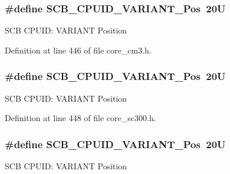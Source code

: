 \subsubsection[{\texorpdfstring{S\+C\+B\+\_\+\+C\+P\+U\+I\+D\+\_\+\+V\+A\+R\+I\+A\+N\+T\+\_\+\+Pos}{SCB_CPUID_VARIANT_Pos}}]{\setlength{\rightskip}{0pt plus 5cm}\#define S\+C\+B\+\_\+\+C\+P\+U\+I\+D\+\_\+\+V\+A\+R\+I\+A\+N\+T\+\_\+\+Pos~20U}\hypertarget{group___c_m_s_i_s___s_c_b_ga104462bd0815391b4044a70bd15d3a71}{}\label{group___c_m_s_i_s___s_c_b_ga104462bd0815391b4044a70bd15d3a71}
S\+CB C\+P\+U\+ID\+: V\+A\+R\+I\+A\+NT Position 

Definition at line 446 of file core\+\_\+cm3.\+h.

\subsubsection[{\texorpdfstring{S\+C\+B\+\_\+\+C\+P\+U\+I\+D\+\_\+\+V\+A\+R\+I\+A\+N\+T\+\_\+\+Pos}{SCB_CPUID_VARIANT_Pos}}]{\setlength{\rightskip}{0pt plus 5cm}\#define S\+C\+B\+\_\+\+C\+P\+U\+I\+D\+\_\+\+V\+A\+R\+I\+A\+N\+T\+\_\+\+Pos~20U}\hypertarget{group___c_m_s_i_s___s_c_b_ga104462bd0815391b4044a70bd15d3a71}{}\label{group___c_m_s_i_s___s_c_b_ga104462bd0815391b4044a70bd15d3a71}
S\+CB C\+P\+U\+ID\+: V\+A\+R\+I\+A\+NT Position 

Definition at line 448 of file core\+\_\+sc300.\+h.

\subsubsection[{\texorpdfstring{S\+C\+B\+\_\+\+C\+P\+U\+I\+D\+\_\+\+V\+A\+R\+I\+A\+N\+T\+\_\+\+Pos}{SCB_CPUID_VARIANT_Pos}}]{\setlength{\rightskip}{0pt plus 5cm}\#define S\+C\+B\+\_\+\+C\+P\+U\+I\+D\+\_\+\+V\+A\+R\+I\+A\+N\+T\+\_\+\+Pos~20U}\hypertarget{group___c_m_s_i_s___s_c_b_ga104462bd0815391b4044a70bd15d3a71}{}\label{group___c_m_s_i_s___s_c_b_ga104462bd0815391b4044a70bd15d3a71}
S\+CB C\+P\+U\+ID\+: V\+A\+R\+I\+A\+NT Position 


